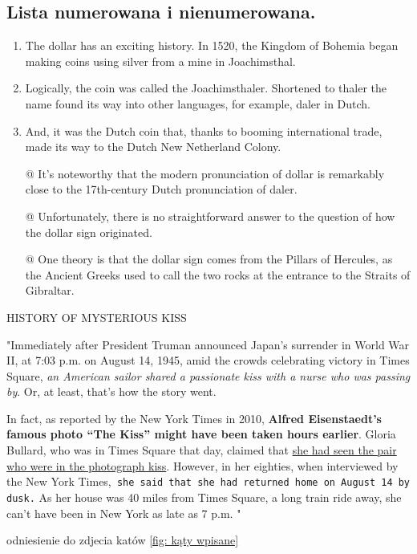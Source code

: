 \subsection{Lista numerowana i nienumerowana.}
\begin{enumerate}
  \item  The dollar has an exciting history. In 1520, the Kingdom of Bohemia began making coins using silver from a mine in Joachimsthal. 
  \item Logically, the coin was called the Joachimsthaler. Shortened to thaler the name found its way into other languages, for example, daler in Dutch.
  \item And, it was the Dutch coin that, thanks to booming international trade, made its way to the Dutch New Netherland Colony.

\end{enumerate}

\begin{itemize}
  \item[@]   It’s noteworthy that the modern pronunciation of dollar is remarkably close to the 17th-century Dutch pronunciation of daler. 
  \item[@]  Unfortunately, there is no straightforward answer to the question of how the dollar sign originated.
  \item[@] One theory is that the dollar sign comes from the Pillars of Hercules, as the Ancient Greeks used to call the two rocks at the entrance to the Straits of Gibraltar.
\end{itemize}




\begin{center}
HISTORY OF MYSTERIOUS KISS

"Immediately after President Truman announced Japan’s surrender in World War II,
at 7:03 p.m. on August 14, 1945, amid the crowds celebrating victory in Times Square,
\emph{ an American sailor shared a passionate kiss with a nurse who was passing by}. Or, at least,
that’s how the story went.

In fact, as reported by the New York Times in 2010, \textbf{Alfred Eisenstaedt’s famous photo
“The Kiss” might have been taken hours earlier}. Gloria Bullard, who was in Times Square that
day, claimed that \underline{she had seen the pair who were in the photograph kiss}. However, in her
eighties, when interviewed by the New York Times,\texttt{ she said that she had returned home on
August 14 by dusk.} As her house was 40 miles from Times Square, a long train ride away, she
can’t have been in New York as late as 7 p.m. "
\end{center}

odniesienie do zdjecia katów
\ref{fig: kąty wpisane}




